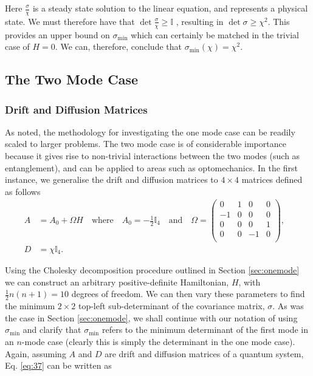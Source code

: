 \documentclass[11pt,a4paper]{article}
\numberwithin{equation}{section}
\begin{document}
	Here $\frac{\sigma}{\chi}$ is a steady state solution to the linear equation, and represents a physical state. We must therefore have that $\det\frac{\sigma}{\chi} \geq \mathbb{I}$ \cite{Adesso14}, resulting in $\det \sigma \geq \chi^2$. This provides an upper bound on $\sigma_\text{min}$ which can certainly be matched in the trivial case of $H=0$. We can, therefore, conclude that $\sigma_\text{min}(\chi)=\chi^{2}$. 

	
	\subsection{The Two Mode Case}
	\label{sec:twomode}
	\subsubsection{Drift and Diffusion Matrices}
	As noted, the methodology for investigating the one mode case can be readily scaled to larger problems. The two mode case is of considerable importance because it gives rise to non-trivial interactions between the two modes (such as entanglement), and can be applied to areas such as optomechanics. In the first instance, we generalise the drift and diffusion matrices to $4 \times 4$ matrices defined as follows
	\begin{align*}
	A &= A_0 + \Omega H \quad\text{where}\quad A_0 = -\frac{1}{2}\mathbb{I}_4\quad\text{and}\quad \Omega = \begin{pmatrix}
	0 & 1 & 0 & 0 \\
	-1 & 0 & 0 & 0\\
	0 & 0 & 0 & 1\\
	0 & 0 & -1 & 0\\
	\end{pmatrix}, &\\
	D &= \chi \mathbb{I}_4 .&
	\end{align*}
	
	Using the Cholesky decomposition procedure outlined in Section \ref{sec:onemode} we can construct an arbitrary positive-definite Hamiltonian, $H$, with $\frac{1}{2}n(n+1)=10$ degrees of freedom. We can then vary these parameters to find the minimum $2 \times 2$ top-left sub-determinant of the covariance matrix, $\sigma$. As was the case in Section \ref{sec:onemode}, we shall continue with our notation of using $\sigma_\text{min}$ and clarify that $\sigma_\text{min}$ refers to the minimum determinant of the first mode in an $n$-mode case (clearly this is simply the determinant in the one mode case). Again, assuming $A$ and $D$ are drift and diffusion matrices of a quantum system, Eq. \ref{eq:37} can be written as 
\end{document}
